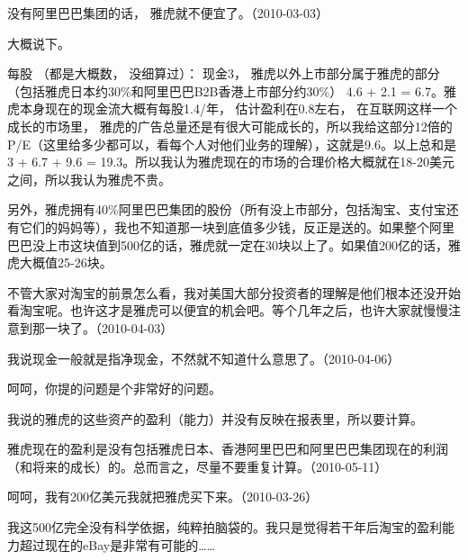 
没有阿里巴巴集团的话， 雅虎就不便宜了。（2010-03-03）


大概说下。

每股 （都是大概数， 没细算过）： 现金3， 雅虎以外上市部分属于雅虎的部分 （包括雅虎日本约30\%和阿里巴巴B2B香港上市部分约30\%） 4.6 + 2.1 = 6.7。雅虎本身现在的现金流大概有每股1.4/年， 估计盈利在0.8左右， 在互联网这样一个成长的市场里， 雅虎的广告总量还是有很大可能成长的，所以我给这部分12倍的P/E（这里给多少都可以，看每个人对他们业务的理解），这就是9.6。以上总和是3 + 6.7 + 9.6 = 19.3。所以我认为雅虎现在的市场的合理价格大概就在18-20美元之间，所以我认为雅虎不贵。

另外，雅虎拥有40\%阿里巴巴集团的股份（所有没上市部分，包括淘宝、支付宝还有它们的妈妈等），我也不知道那一块到底值多少钱，反正是送的。如果整个阿里巴巴没上市这块值到500亿的话，雅虎就一定在30块以上了。如果值200亿的话，雅虎大概值25-26块。

不管大家对淘宝的前景怎么看，我对美国大部分投资者的理解是他们根本还没开始看淘宝呢。也许这才是雅虎可以便宜的机会吧。等个几年之后，也许大家就慢慢注意到那一块了。（2010-04-03）


我说现金一般就是指净现金，不然就不知道什么意思了。（2010-04-06）


呵呵，你提的问题是个非常好的问题。

我说的雅虎的这些资产的盈利（能力）并没有反映在报表里，所以要计算。

雅虎现在的盈利是没有包括雅虎日本、香港阿里巴巴和阿里巴巴集团现在的利润（和将来的成长）的。总而言之，尽量不要重复计算。（2010-05-11）


呵呵，我有200亿美元我就把雅虎买下来。（2010-03-26）


我这500亿完全没有科学依据，纯粹拍脑袋的。我只是觉得若干年后淘宝的盈利能力超过现在的eBay是非常有可能的……

